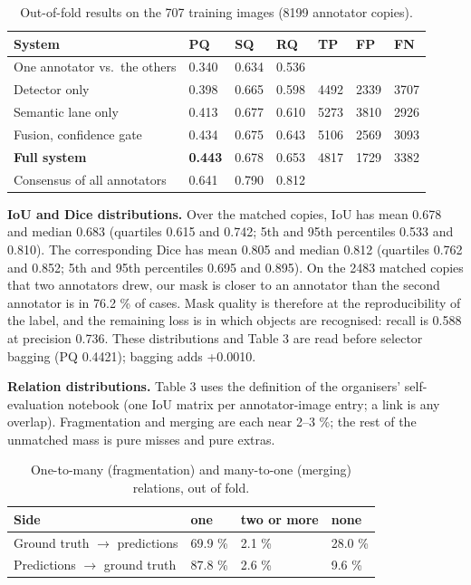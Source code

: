 \begin{table}[t]
\centering\footnotesize
\caption{Out-of-fold results on the 707 training images (8199 annotator copies).}
\begin{tabular}{@{}lllllll@{}}
\toprule
System & PQ & SQ & RQ & TP & FP & FN \\
\midrule
One annotator vs.~the others & 0.340 & 0.634 & 0.536 & & & \\
Detector only & 0.398 & 0.665 & 0.598 & 4492 & 2339 & 3707 \\
Semantic lane only & 0.413 & 0.677 & 0.610 & 5273 & 3810 & 2926 \\
Fusion, confidence gate & 0.434 & 0.675 & 0.643 & 5106 & 2569 & 3093 \\
\textbf{Full system} & \textbf{0.443} & 0.678 & 0.653 & 4817 & 1729 & 3382 \\
Consensus of all annotators & 0.641 & 0.790 & 0.812 & & & \\
\bottomrule
\end{tabular}
\end{table}

\textbf{IoU and Dice distributions.} Over the matched copies, IoU has mean 0.678 and median 0.683
(quartiles 0.615 and 0.742; 5th and 95th percentiles 0.533 and 0.810). The corresponding Dice has
mean 0.805 and median 0.812 (quartiles 0.762 and 0.852; 5th and 95th percentiles 0.695 and 0.895).
On the 2483 matched copies that two annotators drew, our mask is closer to an annotator than the
second annotator is in 76.2 \% of cases. Mask quality is therefore at the reproducibility of the
label, and the remaining loss is in which objects are recognised: recall is 0.588 at precision
0.736. These distributions and Table 3 are read before selector bagging (PQ 0.4421); bagging
adds +0.0010.

\textbf{Relation distributions.} Table 3 uses the definition of the organisers' self-evaluation
notebook (one IoU matrix per annotator-image entry; a link is any overlap). Fragmentation and
merging are each near 2--3 \%; the rest of the unmatched mass is pure misses and pure extras.

\begin{table}[t]
\centering\footnotesize
\caption{One-to-many (fragmentation) and many-to-one (merging) relations, out of fold.}
\begin{tabular}{@{}llll@{}}
\toprule
Side & one & two or more & none \\
\midrule
Ground truth $\rightarrow$ predictions & 69.9 \% & 2.1 \% & 28.0 \% \\
Predictions $\rightarrow$ ground truth & 87.8 \% & 2.6 \% & 9.6 \% \\
\bottomrule
\end{tabular}
\end{table}

